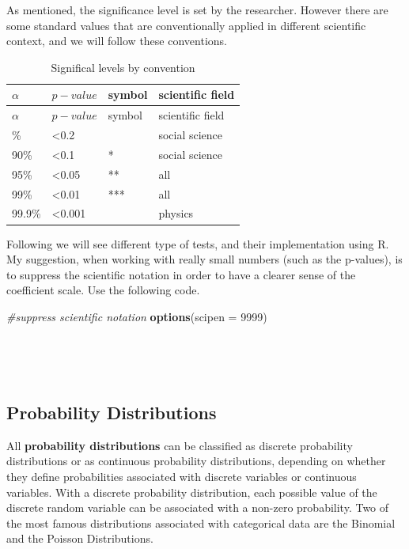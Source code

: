 \documentclass[
]{article}
\newenvironment{Shaded}{\begin{snugshade}}{\end{snugshade}}
\newcommand{\AttributeTok}[1]{\textcolor[rgb]{0.13,0.29,0.53}{#1}}
\newcommand{\CommentTok}[1]{\textcolor[rgb]{0.56,0.35,0.01}{\textit{#1}}}
\newcommand{\DecValTok}[1]{\textcolor[rgb]{0.00,0.00,0.81}{#1}}
\newcommand{\FunctionTok}[1]{\textcolor[rgb]{0.13,0.29,0.53}{\textbf{#1}}}
\newcommand{\NormalTok}[1]{#1}
\begin{document}
As mentioned, the significance level is set by the researcher. However
there are some standard values that are conventionally applied in
different scientific context, and we will follow these conventions.

\begin{longtable}[]{@{}llll@{}}
\caption{Significal levels by convention}\tabularnewline
\toprule\noalign{}
\(\alpha\) & \(p-value\) & symbol & scientific field \\
\midrule\noalign{}
\endfirsthead
\toprule\noalign{}
\(\alpha\) & \(p-value\) & symbol & scientific field \\
\midrule\noalign{}
\endhead
\bottomrule\noalign{}
\endlastfoot
80\% & \textless0.2 & & social science \\
90\% & \textless0.1 & * & social science \\
95\% & \textless0.05 & ** & all \\
99\% & \textless0.01 & *** & all \\
99.9\% & \textless0.001 & & physics \\
\end{longtable}

Following we will see different type of tests, and their implementation
using R. My suggestion, when working with really small numbers (such as
the p-values), is to suppress the scientific notation in order to have a
clearer sense of the coefficient scale. Use the following code.

\begin{Shaded}
\begin{Highlighting}[]
\CommentTok{\#suppress scientific notation}
\FunctionTok{options}\NormalTok{(}\AttributeTok{scipen =} \DecValTok{9999}\NormalTok{)}
\end{Highlighting}
\end{Shaded}

~

~

\hypertarget{probability-distributions}{%
\subsection{Probability Distributions}\label{probability-distributions}}

All \textbf{probability distributions} can be classified as discrete
probability distributions or as continuous probability distributions,
depending on whether they define probabilities associated with discrete
variables or continuous variables. With a discrete probability
distribution, each possible value of the discrete random variable can be
associated with a non-zero probability. Two of the most famous
distributions associated with categorical data are the Binomial and the
Poisson Distributions.
\end{document}

